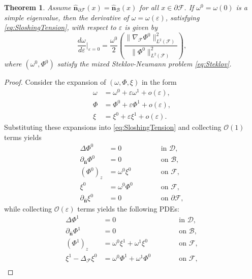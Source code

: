\documentclass[letterpaper, 12pt]{amsart}
\newtheorem{theorem}[definition]{Theorem}
\newcommand{\D}{\mathcal{D}}
\newcommand{\B}{\mathcal{B}}
\newcommand{\F}{\mathcal{F}}
\renewcommand{\O}{\mathcal{O}}
\renewcommand{\o}{o}
\newcommand{\n}{\mathbf{\hat{n}}}
\begin{document}
\begin{theorem}\label{thm:AsympFirstOrder}
Assume $\n_{\partial\F}(x) = \n_\B(x)$ for all $x\in\partial\F$. If $\omega^0 = \omega(0)$ is a simple eigenvalue, then  the derivative of $\omega = \omega(\varepsilon )$, satisfying \eqref{eq:SloshingTension}, with respect to $\varepsilon$ is given by 
\[ \frac{d\omega}{d\varepsilon} \bigg|_{\varepsilon = 0} = \frac{\omega^0}{2}\left(\frac{\|\nabla_\F\Phi^0\|_{L^2(\F)}^2}{\|\Phi^0\|_{L^2(\F)}^2}\right), \]
where $(\omega^0,\Phi^0)$ satisfy the mixed Steklov-Neumann problem \eqref{eq:Steklov}.
\end{theorem}
\begin{proof}
Consider the expansion of $(\omega,\Phi,\xi)$ in the form
\begin{align*}
\omega  &= \omega^0  + \varepsilon\omega^1  + \o(\varepsilon), \\
\Phi  &= \Phi^0 + \varepsilon\Phi^1 + \o(\varepsilon), \\
\xi  &= \xi^0 + \varepsilon\xi^1 + \o(\varepsilon).
\end{align*}
Substituting these expansions into \eqref{eq:SloshingTension} and collecting $\O(1)$ terms yields
\begin{subequations}
\begin{alignat}{2}
\label{eq:Asymp1} \Delta\Phi^0 & = 0 && \qquad\textrm{ in }\D, \\ 
\label{eq:Asymp2} \partial_\n\Phi^0 & = 0 && \qquad\textrm{ on }\B, \\
\label{eq:Asymp3} (\Phi^0)_z & = \omega^0\xi^0 && \qquad\textrm{ on }\F, \\
\label{eq:Asymp4} \xi^0 & = \omega^0\Phi^0 && \qquad\textrm{ on }\F, \\
\label{eq:Asymp5} \partial_\n\xi^0 & = 0 && \qquad\textrm{ on }\partial\F,
\end{alignat}
\end{subequations}
while collecting $\O(\varepsilon)$ terms yields the following PDEs:
\begin{subequations}\label{eq:PertEqns}
\begin{alignat}{2}
\label{eq:Asymp6} \Delta\Phi^1 & = 0 && \qquad\textrm{ in }\D,  \\
\label{eq:Asymp7} \partial_\n\Phi^1 & = 0 && \qquad\textrm{ on }\B, \\
\label{eq:Asymp8} (\Phi^1)_z & = \omega^0\xi^1 + \omega^1\xi^0 && \qquad\textrm{ on }\F, \\
\label{eq:Asymp9} \xi^1 - \Delta_\F\xi^0 & = \omega^0\Phi^1 + \omega^1\Phi^0 && \qquad\textrm{ on }\F, \\

\end{alignat}
\end{subequations}
\end{proof}
\end{document}
